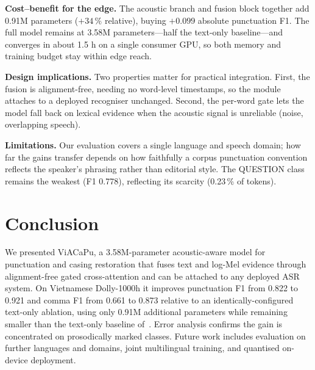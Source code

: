 \documentclass[conference]{IEEEtran}
\begin{document}
\textbf{Cost--benefit for the edge.} The acoustic branch and fusion block together
add 0.91M parameters ($+34\,\%$ relative), buying $+0.099$ absolute punctuation F1.
The full model remains at 3.58M parameters---half the text-only baseline---and
converges in about 1.5 h on a single consumer GPU, so both memory and training
budget stay within edge reach.

\textbf{Design implications.} Two properties matter for practical integration.
First, the fusion is alignment-free, needing no word-level timestamps, so the module
attaches to a deployed recogniser unchanged. Second, the per-word gate lets the
model fall back on lexical evidence when the acoustic signal is unreliable (noise,
overlapping speech).

\textbf{Limitations.} Our evaluation covers a single language and speech domain; how
far the gains transfer depends on how faithfully a corpus punctuation convention
reflects the speaker's phrasing rather than editorial style. The QUESTION class
remains the weakest (F1 0.778), reflecting its scarcity (0.23\,\% of tokens).

\section{Conclusion}

We presented ViACaPu, a 3.58M-parameter acoustic-aware model for punctuation and
casing restoration that fuses text and log-Mel evidence through alignment-free gated
cross-attention and can be attached to any deployed ASR system. On Vietnamese
Dolly-1000h it improves punctuation F1 from 0.822 to 0.921 and comma F1 from 0.661
to 0.873 relative to an identically-configured text-only ablation, using only 0.91M
additional parameters while remaining smaller than the text-only baseline
of~\cite{you2024lightweight}. Error analysis confirms the gain is concentrated on
prosodically marked classes. Future work includes evaluation on further languages
and domains, joint multilingual training, and quantised on-device deployment.
\end{document}
